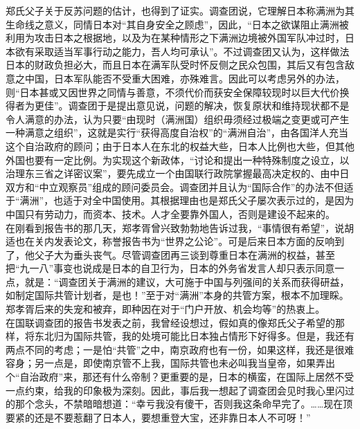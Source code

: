 郑氏父子关于反苏问题的估计，也得到了证实。调查团说，它理解日本称满洲为其生命线之意义，同情日本对“其自身安全之顾虑”，因此，“日本之欲谋阻止满洲被利用为攻击日本之根据地，以及为在某种情形之下满洲边境被外国军队冲过时，日本欲有采取适当军事行动之能力，吾人均可承认”。不过调查团又认为，这样做法日本的财政负担必大，而且日本在满军队受时怀反侧之民众包围，其后又有包含敌意之中国，日本军队能否不受重大困难，亦殊难言。因此可以考虑另外的办法，则“日本甚或又因世界之同情与善意，不须代价而获安全保障较现时以巨大代价换得者为更佳”。调查团于是提出意见说，问题的解决，恢复原状和维持现状都不是令人满意的办法，认为只要“由现时（满洲国）组织毋须经过极端之变更或可产生一种满意之组织”，这就是实行“获得高度自治权”的“满洲自治”，由各国洋人充当这个自治政府的顾问；由于日本人在东北的权益大些，日本人比例也大些，但其他外国也要有一定比例。为实现这个新政体，“讨论和提出一种特殊制度之设立，以治理东三省之详密议案”，要先成立一个由国联行政院掌握最高决定权的、由中日双方和“中立观察员”组成的顾问委员会。调查团并且认为“国际合作”的办法不但适于“满洲”，也适于对全中国使用。其根据理由也是郑氏父子屡次表示过的，是因为中国只有劳动力，而资本、技术。人才全要靠外国人，否则是建设不起来的。\\

在刚看到报告书的那几天，郑孝胥曾兴致勃勃地告诉过我，“事情很有希望”，说胡适也在关内发表论文，称誉报告书为“世界之公论”。可是后来日本方面的反响到了，他父子大为垂头丧气。尽管调查团再三谈到尊重日本在满洲的权益，甚至把“九一八”事变也说成是日本的自卫行为，日本的外务省发言人却只表示同意一点，就是：“调查团关于满洲的建议，大可施于中国与列强间的关系而获得研益，如制定国际共管计划者，是也！”至于对“满洲”本身的共管方案，根本不加理睬。郑孝胥后来的失宠和被弃，即种因在对于“门户开放、机会均等”的热衷上。\\

在国联调查团的报告书发表之前，我曾经设想过，假如真的像郑氏父子希望的那样，将东北归为国际共管，我的处境可能比日本独占情形下好得多。但是，我还有两点不同的考虑；一是怕“共管”之中，南京政府也有一份，如果这样，我还是很难容身；另一点是，即使南京管不上我，国际共管也未必叫我当皇帝，如果弄出个“自治政府”来，那还有什么帝制？更重要的是，日本的横蛮，在国际上居然不受一点约束，给我的印象极为深刻。因此，事后我一想起了调查团会见时我心里闪过的那个念头，不禁暗暗想道：“幸亏我没有傻干，否则我这条命早完了。……现在顶要紧的还是不要惹翻了日本人，要想重登大宝，还非靠日本人不可呀！”\\